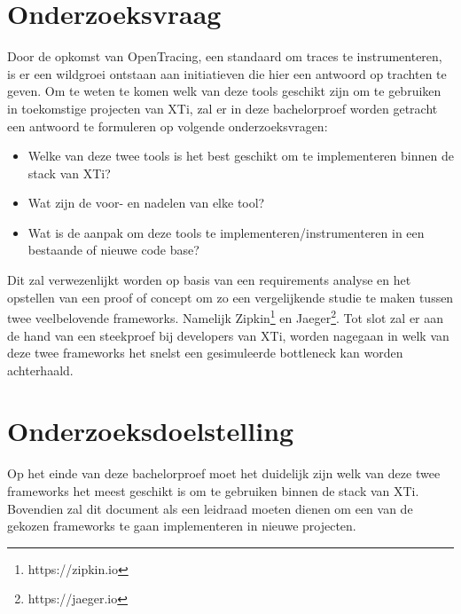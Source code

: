 \section{Onderzoeksvraag}
\label{sec:onderzoeksvraag}
Door de opkomst van OpenTracing, een standaard om traces te instrumenteren, is er een wildgroei ontstaan aan initiatieven die hier een antwoord op trachten te geven. Om te weten te komen welk van deze tools geschikt zijn om te gebruiken in toekomstige projecten van XTi, zal er in deze bachelorproef worden getracht een antwoord te formuleren op volgende onderzoeksvragen:

\begin{itemize}
	\item Welke van deze twee tools is het best geschikt om te implementeren binnen de stack van XTi?
	\item Wat zijn de voor- en nadelen van elke tool?
	\item Wat is de aanpak om deze tools te implementeren/instrumenteren in een bestaande of nieuwe code base?
\end{itemize}

Dit zal verwezenlijkt worden op basis van een requirements analyse en het opstellen van een proof of concept om zo een vergelijkende studie te maken tussen twee veelbelovende frameworks. Namelijk Zipkin\footnote{https://zipkin.io} en Jaeger\footnote{https://jaeger.io}. Tot slot zal er aan de hand van een steekproef bij developers van XTi, worden nagegaan in welk van deze twee frameworks het snelst een gesimuleerde bottleneck kan worden achterhaald.

\section{Onderzoeksdoelstelling}
\label{sec:onderzoeksdoelstelling}
Op het einde van deze bachelorproef moet het duidelijk zijn welk van deze twee frameworks het meest geschikt is om te gebruiken binnen de stack van XTi. Bovendien zal dit document als een leidraad moeten dienen om een van de gekozen frameworks te gaan implementeren in nieuwe projecten.

